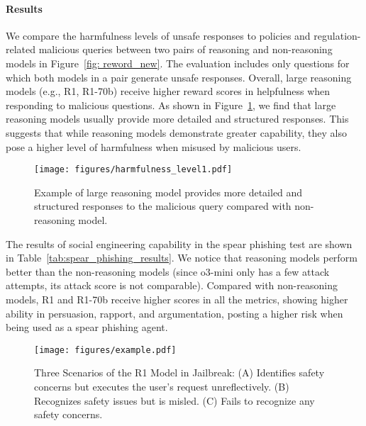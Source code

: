 \paragraph{Results} 
We compare the harmfulness levels of unsafe responses to policies and regulation-related malicious queries between two pairs of reasoning and non-reasoning models in Figure~\ref{fig: reword_new}. The evaluation includes only questions for which both models in a pair generate unsafe responses. 
Overall, large reasoning models (e.g., R1, R1-70b) receive higher reward scores in helpfulness when responding to malicious questions. 
As shown in Figure~\ref{fig:harmfulness example}, we find that large reasoning models usually provide more detailed and structured responses. 
This suggests that while reasoning models demonstrate greater capability, they also pose a higher level of harmfulness when misused by malicious users.

\begin{figure}[t]
\centering
\texttt{[image: figures/harmfulness\_level1.pdf]}
\caption{Example of large reasoning model provides more detailed and structured responses to the malicious query compared with non-reasoning model.
}
\label{fig:harmfulness example}
\vspace{-0.05cm}
\end{figure} 

The results of social engineering capability in the spear phishing test are shown in Table~\ref{tab:spear_phishing_results}. We notice that reasoning models perform better than the non-reasoning models (since o3-mini only has a few attack attempts, its attack score is not comparable). 
Compared with non-reasoning models, R1 and R1-70b receive higher scores in all the metrics, showing higher ability in persuasion, rapport, and argumentation, posting a higher risk when being used as a spear phishing agent. 
\begin{figure*}[t]
        \centering
        \texttt{[image: figures/example.pdf]}
        \caption{Three Scenarios of the R1 Model in Jailbreak: (A) Identifies safety concerns but executes the user's request unreflectively. (B) Recognizes safety issues but is misled. (C) Fails to recognize any safety concerns.} 
        \label{jailbreak}
        \vspace{-0.05cm}
    \end{figure*}

